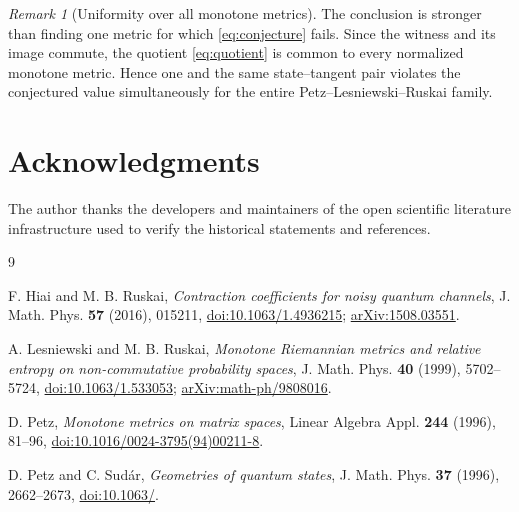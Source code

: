 \documentclass[11pt]{amsart}
\theoremstyle{definition}
\theoremstyle{remark}
\newtheorem{remark}[theorem]{Remark}
\begin{document}
\begin{remark}[Uniformity over all monotone metrics]
The conclusion is stronger than finding one metric for which \eqref{eq:conjecture} fails. Since the witness and its image commute, the quotient \eqref{eq:quotient} is common to every normalized monotone metric. Hence one and the same state--tangent pair violates the conjectured value simultaneously for the entire Petz--Lesniewski--Ruskai family.
\end{remark}

\section*{Acknowledgments}
The author thanks the developers and maintainers of the open scientific literature infrastructure used to verify the historical statements and references.

\begin{thebibliography}{9}

F. Hiai and M. B. Ruskai,
\emph{Contraction coefficients for noisy quantum channels},
J. Math. Phys. \textbf{57} (2016), 015211,
\href{https://doi.org/10.1063/1.4936215}{doi:10.1063/1.4936215};
\href{https://arxiv.org/abs/1508.03551}{arXiv:1508.03551}.

A. Lesniewski and M. B. Ruskai,
\emph{Monotone Riemannian metrics and relative entropy on non-commutative probability spaces},
J. Math. Phys. \textbf{40} (1999), 5702--5724,
\href{https://doi.org/10.1063/1.533053}{doi:10.1063/1.533053};
\href{https://arxiv.org/abs/math-ph/9808016}{arXiv:math-ph/9808016}.

D. Petz,
\emph{Monotone metrics on matrix spaces},
Linear Algebra Appl. \textbf{244} (1996), 81--96,
\href{https://doi.org/10.1016/0024-3795(94)00211-8}{doi:10.1016/0024-3795(94)00211-8}.

D. Petz and C. Sud\'ar,
\emph{Geometries of quantum states},
J. Math. Phys. \textbf{37} (1996), 2662--2673,
\href{https://doi.org/10.1063/1.531535}{doi:10.1063/}.

\end{thebibliography}
\end{document}
